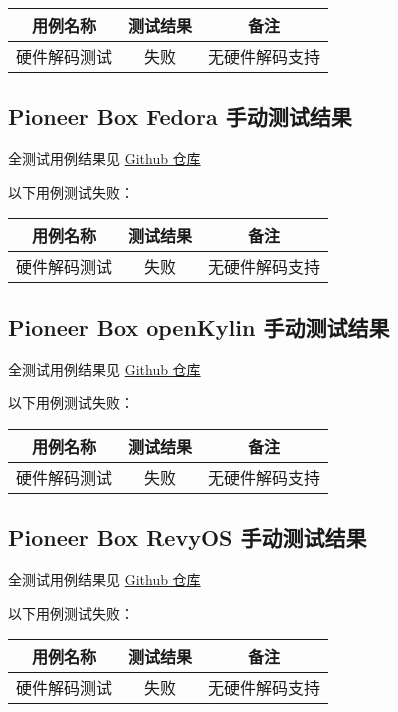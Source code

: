 \documentclass{article}
\begin{document}
\begin{table}[H]
\centering
\begin{tabular}{|c|c|c|}
\hline
\textbf{用例名称} & \textbf{测试结果} & \textbf{备注} \\ \hline
硬件解码测试 & 失败 & 无硬件解码支持 \\ \hline
\end{tabular}
\end{table}

\subsection{Pioneer Box Fedora 手动测试结果}

全测试用例结果见 \href{https://github.com/QA-Team-lo/firefox_test/tree/main/p_fe}{Github 仓库}

以下用例测试失败：

\begin{table}[H]
\centering
\begin{tabular}{|c|c|c|}
\hline
\textbf{用例名称} & \textbf{测试结果} & \textbf{备注} \\ \hline
硬件解码测试 & 失败 & 无硬件解码支持 \\ \hline
\end{tabular}
\end{table}

\subsection{Pioneer Box openKylin 手动测试结果}

全测试用例结果见 \href{https://github.com/QA-Team-lo/firefox_test/tree/main/p_ok}{Github 仓库}

以下用例测试失败：

\begin{table}[H]
\centering
\begin{tabular}{|c|c|c|}
\hline
\textbf{用例名称} & \textbf{测试结果} & \textbf{备注} \\ \hline
硬件解码测试 & 失败 & 无硬件解码支持 \\ \hline
\end{tabular}
\end{table}

\subsection{Pioneer Box RevyOS 手动测试结果}

全测试用例结果见 \href{https://github.com/QA-Team-lo/firefox_test/tree/main/p_re}{Github 仓库}

以下用例测试失败：

\begin{table}[H]
\centering
\begin{tabular}{|c|c|c|}
\hline
\textbf{用例名称} & \textbf{测试结果} & \textbf{备注} \\ \hline
硬件解码测试 & 失败 & 无硬件解码支持 \\ \hline
\end{tabular}
\end{table}

\end{document}
